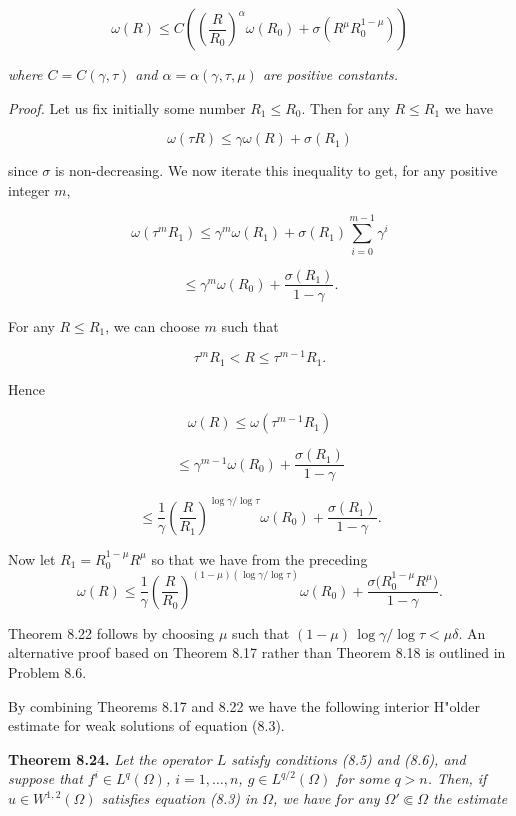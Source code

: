 \begin{equation}
\omega(R)\le C\!\left(\left(\frac{R}{R_0}\right)^{\alpha}\omega(R_0)+\sigma\!\left(R^{\mu}R_0^{1-\mu}\right)\right)
\tag{8.67}
\end{equation}

\textit{where $C=C(\gamma,\tau)$ and $\alpha=\alpha(\gamma,\tau,\mu)$ are positive constants.}

\medskip

\noindent\textit{Proof.} Let us fix initially some number $R_1\le R_0$. Then for any $R\le R_1$ we have

\[
\omega(\tau R)\le \gamma\omega(R)+\sigma(R_1)
\]

since $\sigma$ is non-decreasing. We now iterate this inequality to get, for any positive integer $m$,

\[
\omega(\tau^m R_1)\le \gamma^m\omega(R_1)+\sigma(R_1)\sum_{i=0}^{m-1}\gamma^i
\]

\[
\le \gamma^m\omega(R_0)+\frac{\sigma(R_1)}{1-\gamma}.
\]

For any $R\le R_1$, we can choose $m$ such that

\[
\tau^m R_1<R\le \tau^{m-1}R_1.
\]

Hence

\[
\omega(R)\le \omega(\tau^{m-1}R_1)
\]

\[
\le \gamma^{m-1}\omega(R_0)+\frac{\sigma(R_1)}{1-\gamma}
\]

\[
\le \frac{1}{\gamma}\left(\frac{R}{R_1}\right)^{\log\gamma/\log\tau}\omega(R_0)+\frac{\sigma(R_1)}{1-\gamma}.
\]



Now let $R_1 = R_0^{1-\mu} R^\mu$ so that we have from the preceding
\[
\omega(R) \le \frac{1}{\gamma} \left( \frac{R}{R_0} \right)^{(1-\mu)(\log \gamma / \log \tau)} \omega(R_0) + \frac{\sigma\bigl(R_0^{1-\mu} R^\mu\bigr)}{1-\gamma}.
\]

Theorem 8.22 follows by choosing $\mu$ such that $(1-\mu)\,\log \gamma / \log \tau < \mu\delta$. An alternative proof based on Theorem 8.17 rather than Theorem 8.18 is outlined in Problem 8.6.

By combining Theorems 8.17 and 8.22 we have the following interior H"older estimate for weak solutions of equation (8.3).

\textbf{Theorem 8.24.} \textit{Let the operator $L$ satisfy conditions (8.5) and (8.6), and suppose that $f^i \in L^q(\Omega)$, $i = 1,\dots,n$, $g \in L^{q/2}(\Omega)$ for some $q>n$. Then, if $u \in W^{1,2}(\Omega)$ satisfies equation (8.3) in $\Omega$, we have for any $\Omega' \Subset \Omega$ the estimate}

